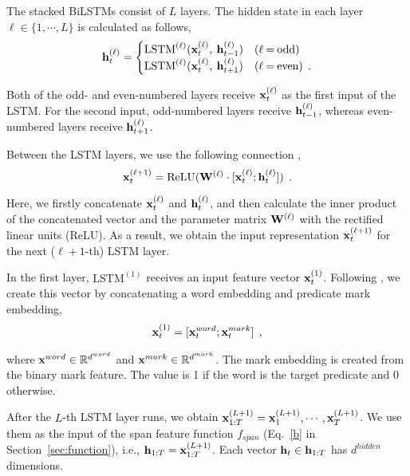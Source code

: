 \documentclass[11pt,a4paper]{article}
\begin{document}
The stacked BiLSTMs consist of $L$ layers.
The hidden state in each layer $\ell \in \{1, \cdots , L\}$ is calculated as follows,
\begin{equation}
\nonumber
  {\bf h}^{(\ell)}_t = \begin{cases}
    \text{LSTM}^{(\ell)} ({\bf x}^{(\ell)}_t, \: {\bf h}^{(\ell)}_{t-1}) & (\ell \: \mbox{=} \: \mbox{odd}) \\
    \text{LSTM}^{(\ell)} ({\bf x}^{(\ell)}_t, \: {\bf h}^{(\ell)}_{t+1}) & (\ell \: \mbox{=} \: \mbox{even}) \:\: .
  \end{cases}
\end{equation}

\noindent
Both of the odd- and even-numbered layers receive ${\bf x}^{(\ell)}_t$ as the first input of the LSTM.
For the second input, odd-numbered layers receive ${\bf h}^{(\ell)}_{t-1}$, whereas even-numbered layers receive ${\bf h}^{(\ell)}_{t+1}$.

Between the LSTM layers, we use the following connection \cite{zhou:15},
\[
{\bf x}^{(\ell+1)}_t = \text{ReLU}({\bf W}^{(\ell)} \cdot [ {\bf x}^{(\ell)}_t ; {\bf h}^{(\ell)}_t ]) \:\:.
\]

\noindent
Here, we firstly concatenate ${\bf x}^{(\ell)}_t$ and ${\bf h}^{(\ell)}_t$, and then calculate the inner product of the concatenated vector and the parameter matrix ${\bf W}^{(\ell)}$ with the rectified linear units (ReLU).
As a result, we obtain the input representation ${\bf x}^{(\ell+1)}_t$ for the next ($\ell+1$-th) LSTM layer.

In the first layer, $\text{LSTM}^{(1)}$ receives an input feature vector ${\bf x}^{(1)}_t$.
Following , we create this vector by concatenating a word embedding and predicate mark embedding,
\begin{align}
\nonumber
{\bf x}^{(1)}_t = [{\bf x}^{word}_t ; {\bf x}^{mark}_t] \:\:,
\end{align}

\noindent
where ${\bf x}^{word} \in \mathbb{R}^{d^{word}}$ and ${\bf x}^{mark} \in \mathbb{R}^{d^{mark}}$.
The mark embedding is created from the binary mark feature.
The value is 1 if the word is the target predicate and 0 otherwise.


After the $L$-th LSTM layer runs, we obtain ${\bf x}^{(L+1)}_{1:T} = {\bf x}^{(L+1)}_1, \cdots , {\bf x}^{(L+1)}_T$.
We use them as the input of the span feature function $f_{span}$ (Eq.~\ref{b} in Section~\ref{sec:function}), i.e., ${\bf h}_{1:T} = {\bf x}^{(L+1)}_{1:T}$.
Each vector ${\bf h}_t \in {\bf h}_{1:T}$ has $d^{hidden}$ dimensions.
\end{document}
